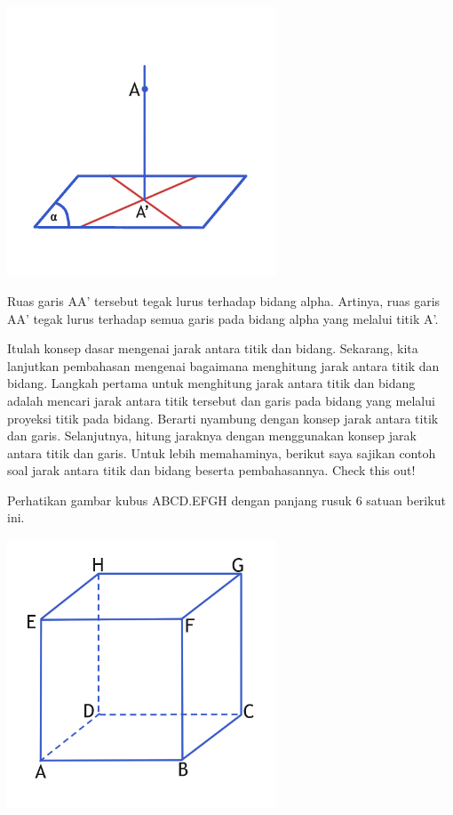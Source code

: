 \documentclass[11pt,fleqn]{book} %
\begin{document}
\includegraphics[width = 8cm, height= 8cm]{Pictures/dede2.jpg}

	Ruas garis AA' tersebut tegak lurus terhadap bidang alpha. Artinya, ruas garis AA' tegak lurus terhadap semua garis pada bidang alpha yang melalui titik A'.

	Itulah konsep dasar mengenai jarak antara titik dan bidang. Sekarang, kita lanjutkan pembahasan mengenai bagaimana menghitung jarak antara titik dan bidang. Langkah pertama untuk menghitung jarak antara titik dan bidang adalah mencari jarak antara titik tersebut dan garis pada bidang yang melalui proyeksi titik pada bidang. Berarti nyambung dengan konsep jarak antara titik dan garis. Selanjutnya, hitung jaraknya dengan menggunakan konsep jarak antara titik dan garis. Untuk lebih memahaminya, berikut saya sajikan contoh soal jarak antara titik dan bidang beserta pembahasannya. Check this out!

	Perhatikan gambar kubus ABCD.EFGH dengan panjang rusuk 6 satuan berikut ini.

\includegraphics[width = 8cm, height= 8cm]{Pictures/dede3.jpg}
\end{document}
